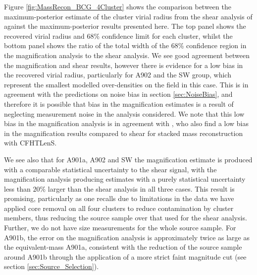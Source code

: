 \documentclass[useAMS,usenatbib,times,letter,amssymb]{mn2e}
\begin{document}


Figure \ref{fig:MassRecon_BCG_4Cluster} shows the comparison between the maximum-posterior estimate of the cluster virial radius from the shear analysis of \cite{Heymans:2008p2060} against the maximum-posterior results presented here. The top panel shows the recovered virial radius and $68\%$ confidence limit for each cluster, whilst the bottom panel shows the ratio of the total width of the 68\% confidence region in the magnification analysis to the shear analysis. We see good agreement between the magnification and shear results, however there is evidence for a low bias in the recovered virial radius, particularly for A902 and the SW group, which represent the smallest modelled over-densities on the field in this case. This is in agreement with the predictions on noise bias in section \ref{sec:NoiseBias}, and therefore it is possible that bias in the magnification estimates is a result of neglecting measurement noise in the analysis considered. We note that this low bias in the magnification analysis is in agreement with \cite{Ford:2014p2825}, who also find a low bias in the magnification results compared to shear for stacked mass reconstruction with CFHTLenS.

We see also that for A901a, A902 and SW the magnification estimate is produced with a comparable statistical uncertainty to the shear signal, with the magnification analysis producing estimates with a purely statistical uncertainty less than $20\%$ larger than the shear analysis in all three cases. This result is promising, particularly as one recalls due to limitations in the data we have applied core removal on all four clusters to reduce contamination by cluster members, thus reducing the source sample over that used for the shear analysis. Further, we do not have size measurements for the whole source sample. For A901b, the error on the magnification analysis is approximately twice as large as the equivalent-mass A901a, consistent with the reduction of the source sample around A901b through the application of a more strict faint magnitude cut (see section \ref{sec:Source_Selection}).
\end{document}
